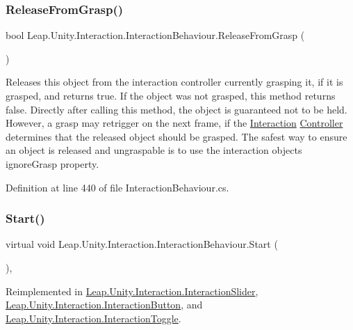 \subsubsection{\texorpdfstring{ReleaseFromGrasp()}{ReleaseFromGrasp()}}
{\footnotesize\ttfamily bool Leap.\+Unity.\+Interaction.\+Interaction\+Behaviour.\+Release\+From\+Grasp (\begin{DoxyParamCaption}{ }\end{DoxyParamCaption})}



Releases this object from the interaction controller currently grasping it, if it is grasped, and returns true. If the object was not grasped, this method returns false. Directly after calling this method, the object is guaranteed not to be held. However, a grasp may retrigger on the next frame, if the \mbox{\hyperlink{namespace_leap_1_1_unity_1_1_interaction}{Interaction}} \mbox{\hyperlink{class_leap_1_1_controller}{Controller}} determines that the released object should be grasped. The safest way to ensure an object is released and ungraspable is to use the interaction object\textquotesingle{}s ignore\+Grasp property. 



Definition at line 440 of file Interaction\+Behaviour.\+cs.

\mbox{\label{class_leap_1_1_unity_1_1_interaction_1_1_interaction_behaviour_ae5fabec0a3dbf845c0307b5eb813e993}} 
\subsubsection{\texorpdfstring{Start()}{Start()}}
{\footnotesize\ttfamily virtual void Leap.\+Unity.\+Interaction.\+Interaction\+Behaviour.\+Start (\begin{DoxyParamCaption}{ }\end{DoxyParamCaption})\hspace{0.3cm}{\ttfamily [protected]}, {\ttfamily [virtual]}}



Reimplemented in \mbox{\hyperlink{class_leap_1_1_unity_1_1_interaction_1_1_interaction_slider_a7a15aed4a6f46dcf1b37ced85386b33b}{Leap.\+Unity.\+Interaction.\+Interaction\+Slider}}, \mbox{\hyperlink{class_leap_1_1_unity_1_1_interaction_1_1_interaction_button_a24a0efb036a0b9ac108e9bf1d5b9fb62}{Leap.\+Unity.\+Interaction.\+Interaction\+Button}}, and \mbox{\hyperlink{class_leap_1_1_unity_1_1_interaction_1_1_interaction_toggle_ab72d4861fbce848ae802d990917ee50e}{Leap.\+Unity.\+Interaction.\+Interaction\+Toggle}}.



